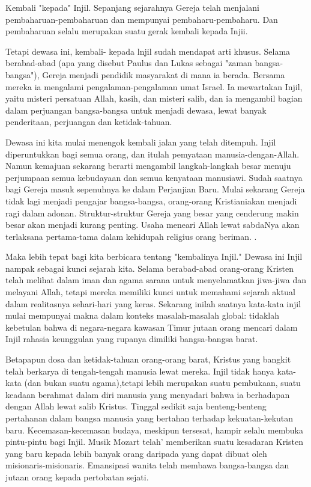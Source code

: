 
Kembali "kepada" Injil. Sepanjang sejarahnya Gereja telah menjalani pembaharuan-pembaharuan dan mempunyai pembaharu-pembaharu. Dan pembaharuan selalu merupakan suatu gerak kembali kepada Injii.

Tetapi dewasa ini, kembali- kepada lnjil sudah mendapat arti khusus. Selama berabad-abad (apa yang disebut Paulus dan Lukas sebagai "zaman bangsa-bangsa"), Gereja menjadi pendidik masyarakat di mana ia berada. Bersama mereka ia mengalami pengalaman-pengalaman umat Israel. Ia mewartakan Injil, yaitu misteri persatuan Allah, kasih, dan misteri salib, dan ia mengambil bagian dalam perjuangan bangsa-bangsa untuk menjadi dewasa, lewat banyak penderitaan, perjuangan dan ketidak-tahuan.

Dewasa ini kita mulai menengok kembali jalan yang telah ditempuh. Injil diperuntukkan bagi semua orang, dan itulah pemyataan manusia-dengan-Allah. Namun kemajuan sekarang berarti mengambil langkah-langkah besar menuju perjumpaan semua kebudayaan dan semua kenyataan manusiawi. Sudah saatnya bagi Gereja masuk sepenuhnya ke dalam Perjanjian Baru. Mulai sekarang Gereja tidak lagi menjadi pengajar bangsa-bangsa, orang-orang Kristianiakan menjadi ragi dalam adonan. Struktur-struktur Gereja yang besar yang cenderung makin besar akan menjadi kurang penting. Usaha meneari Allah lewat sabdaNya akan terlaksana pertama-tama dalam kehidupah religius orang beriman. .

Maka lebih tepat bagi kita berbicara tentang "kembalinya Injil." Dewasa ini Injil nampak sebagai kunci sejarah kita. Selama berabad-abad orang-orang Kristen telah melihat dalam iman dan agama sarana untuk menyelamatkan jiwa-jiwa dan melayani Allah, tetapi mereka memiliki kunci untuk memahami sejarah aktual dalam realitasnya sehari-hari yang keras. Sekarang inilah saatnya kata-kata injil mulai mempunyai makna dalam konteks masalah-masalah global: tidaklah kebetulan bahwa di negara-negara kawasan Timur jutaan orang mencari dalam Injil rahasia keunggulan yang rupanya dimiliki bangsa-bangsa barat.

Betapapun dosa dan ketidak-tahuan orang-orang barat, Kristus yang bangkit telah berkarya di tengah-tengah manusia lewat mereka. Injil tidak hanya kata-kata (dan bukan suatu agama),tetapi lebih merupakan suatu pembukaan, suatu keadaan berahmat dalam diri manusia yang menyadari bahwa ia berhadapan dengan Allah lewat salib Kristus. Tinggal sedikit saja benteng-benteng pertahanan dalam bangsa manusia yang bertahan terhadap kekuatan-kekutan baru. Kecemasan-kecemasan budaya, meskipun tersesat, hampir selalu membuka pintu-pintu bagi Injil. Musik Mozart telah' memberikan suatu kesadaran Kristen yang baru kepada lebih banyak orang daripada yang dapat dibuat oleh misionaris-misionaris. Emansipasi wanita telah membawa bangsa-bangsa dan jutaan orang kepada pertobatan sejati.


